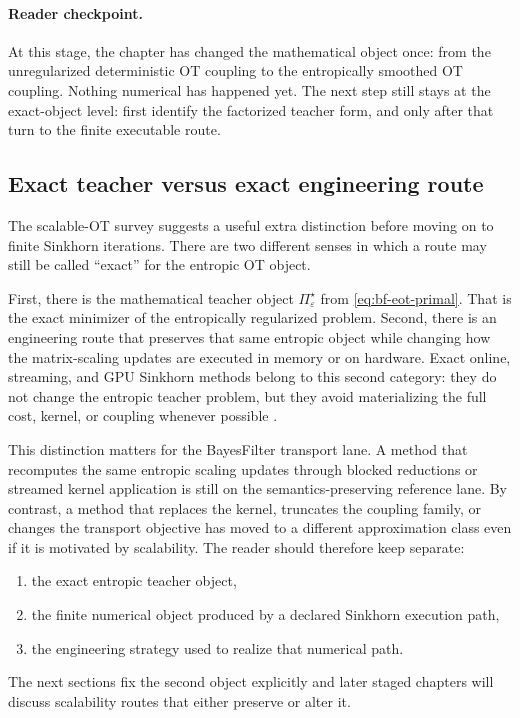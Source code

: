 \paragraph{Reader checkpoint.}
At this stage, the chapter has changed the mathematical object once: from the
unregularized deterministic OT coupling to the entropically smoothed OT coupling.
Nothing numerical has happened yet.  The next step still stays at the exact-object
level: first identify the factorized teacher form, and only after that turn to the
finite executable route.

\subsection{Exact teacher versus exact engineering route}
\label{sec:bf-eot-teacher-versus-engineering}

The scalable-OT survey suggests a useful extra distinction before moving on to
finite Sinkhorn iterations.  There are two different senses in which a route may
still be called ``exact'' for the entropic OT object.

First, there is the mathematical teacher object
\(\Pi_\varepsilon^\star\) from \eqref{eq:bf-eot-primal}.  That is the exact
minimizer of the entropically regularized problem.  Second, there is an
engineering route that preserves that same entropic object while changing how the
matrix-scaling updates are executed in memory or on hardware.  Exact online,
streaming, and GPU Sinkhorn methods belong to this second category: they do not
change the entropic teacher problem, but they avoid materializing the full cost,
kernel, or coupling whenever possible \citep{feydy2019geomloss,charlier2021keops,ye2026flashsinkhorn,xiao2026fastsinkhorn}.

This distinction matters for the BayesFilter transport lane.  A method that
recomputes the same entropic scaling updates through blocked reductions or
streamed kernel application is still on the semantics-preserving reference lane.
By contrast, a method that replaces the kernel, truncates the coupling family, or
changes the transport objective has moved to a different approximation class even
if it is motivated by scalability.  The reader should therefore keep separate:
\begin{enumerate}[label=(\roman*)]
  \item the exact entropic teacher object,
  \item the finite numerical object produced by a declared Sinkhorn execution
    path,
  \item the engineering strategy used to realize that numerical path.
\end{enumerate}
The next sections fix the second object explicitly and later staged chapters will
discuss scalability routes that either preserve or alter it.


